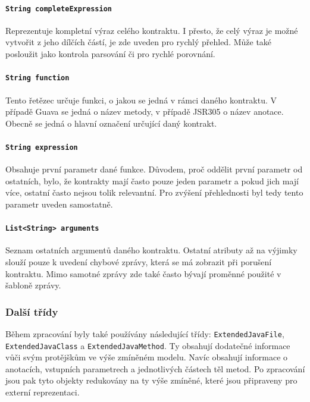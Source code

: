 					\paragraph{\texttt{String completeExpression}} 
						Reprezentuje kompletní výraz celého kontraktu. I přesto, že celý výraz je možné vytvořit z jeho dílčích částí, je zde uveden pro rychlý přehled. Může také posloužit jako kontrola parsování či pro rychlé porovnání.
			
					\paragraph{\texttt{String function}} 
						Tento řetězec určuje funkci, o jakou se jedná v rámci daného kontraktu. V případě Guava se jedná o název metody, v případě JSR305 o název anotace. Obecně se jedná o hlavní označení určující daný kontrakt.
			
					\paragraph{\texttt{String expression}} 
						Obsahuje první parametr dané funkce. Důvodem, proč oddělit první parametr od ostatních, bylo, že kontrakty mají často pouze jeden parametr a pokud jich mají více, ostatní často nejsou tolik relevantní. Pro zvýšení přehlednosti byl tedy tento parametr uveden samostatně.
			
					\paragraph{\texttt{List<String> arguments}} 
						Seznam ostatních argumentů daného kontraktu. Ostatní atributy až na výjimky slouží pouze k uvedení chybové zprávy, která se má zobrazit při porušení kontraktu. Mimo samotné zprávy zde také často bývají proměnné použité v šabloně zprávy.
					
				\subsubsection{Další třídy} 
					Během zpracování byly také používány následující třídy: \texttt{ExtendedJavaFile}, \texttt{ExtendedJavaClass} a \texttt{ExtendedJavaMethod}. Ty obsahují dodatečné informace vůči svým protějškům ve výše zmíněném modelu. Navíc obsahují informace o anotacích, vstupních parametrech a jednotlivých částech těl metod. Po zpracování jsou pak tyto objekty redukovány na ty výše zmíněné, které jsou připraveny pro externí reprezentaci.
		

